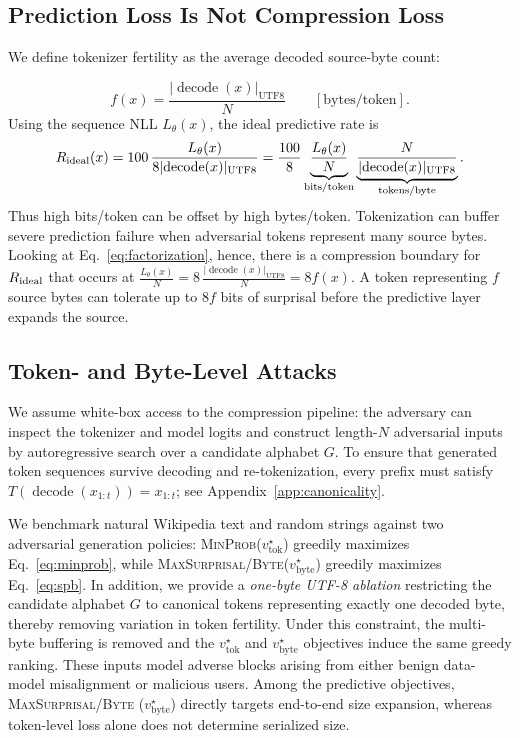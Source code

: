 \documentclass{article}
\newcommand{\sparagraph}[1]{\vspace{1mm}\noindent {\bf #1}}
\newcommand{\MinProb}[0]{\textsc{MinProb}}
\newcommand{\MaxSurprisal}[0]{\textsc{MaxSurprisal/Byte}}
\newcommand{\bytes}[1]{\lvert #1\rvert_{\mathrm{UTF8}}}
\newcommand{\vtok}{v^\star_{\mathrm{tok}}}
\newcommand{\vbyte}{v^\star_{\mathrm{byte}}}
\begin{document}
\subsection{Prediction Loss Is Not Compression Loss}
\label{sec:objective-mismatch}

We define tokenizer fertility as the average decoded source-byte count:

\begin{equation} f(x)=\frac{\bytes{\operatorname{decode}(x)}}{N} \qquad [\mathrm{bytes/token}].
\end{equation}
Using the sequence NLL $L_\theta(x)$, the ideal predictive rate is
\begin{equation}
  R_{\rm ideal}(x)=
  100\,\frac{L_\theta(x)}{8\bytes{\operatorname{decode}(x)}}
  =  \frac{100}{8}
  \underbrace{\frac{L_\theta(x)}{N}}_{\text{bits/token}}
  \underbrace{\frac{N}{\bytes{\operatorname{decode}(x)}}}_{\text{tokens/byte}}.
  \label{eq:factorization}
\end{equation}
Thus high bits/token can be offset by high bytes/token. Tokenization can buffer severe prediction failure when adversarial tokens represent many source bytes. Looking at Eq.~\eqref{eq:factorization}, hence, there is a compression boundary for $R_{\rm ideal}$ that occurs at $\frac{L_\theta(x)}{N} = 8\,\frac{\bytes{\operatorname{decode}(x)}}{N} = 8 f(x)$. A token representing $f$ source bytes can tolerate up to $8f$ bits of surprisal before the predictive layer expands the source.

\subsection{Token- and Byte-Level Attacks}

\sparagraph{Threat Model.}
We assume white-box access to the compression pipeline: the adversary can inspect the tokenizer and model logits and construct length-$N$ adversarial inputs by autoregressive search over a candidate alphabet $G$. To ensure that generated token sequences survive decoding and re-tokenization, every prefix must satisfy $T(\operatorname{decode}(x_{1:t}))=x_{1:t}$; see Appendix~\ref{app:canonicality}.

\sparagraph{Adversarial Input Generation.}
We benchmark natural Wikipedia text and random strings against two adversarial generation policies: \MinProb ($ \vtok$) greedily maximizes Eq.~\eqref{eq:minprob}, while \MaxSurprisal  ($ \vbyte$) greedily maximizes Eq.~\eqref{eq:spb}. In addition, we provide a \emph{one-byte UTF-8 ablation} restricting the candidate alphabet $G$ to canonical tokens representing exactly one decoded byte, thereby removing variation in token fertility. Under this constraint, the multi-byte buffering is removed and the $\vtok$ and $\vbyte$ objectives induce the same greedy ranking.  These inputs model adverse blocks arising from either benign data-model misalignment or malicious users. Among the predictive objectives, \MaxSurprisal{} ($\vbyte$) directly targets end-to-end size expansion, whereas token-level loss alone does not determine serialized size.
\end{document}
